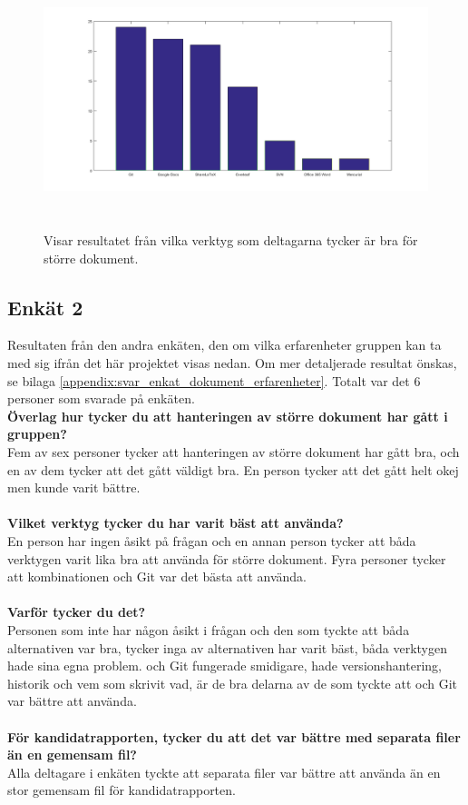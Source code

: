 \begin{figure}[H]
	\centering
	\includegraphics[width=150mm,height=75mm]{figures/best_document_tool.png}
	\caption{Visar resultatet från vilka verktyg som deltagarna tycker är bra för större dokument.}
	\label{fig:best_document_tool}
\end{figure}

\subsection{Enkät 2}
Resultaten från den andra enkäten, den om vilka erfarenheter gruppen kan ta med sig ifrån det här projektet visas nedan. Om mer detaljerade resultat önskas, se bilaga \ref{appendix:svar_enkat_dokument_erfarenheter}. Totalt var det 6 personer som svarade på enkäten.\\
\textbf{Överlag hur tycker du att hanteringen av större dokument har gått i gruppen?}\\
Fem av sex personer tycker att hanteringen av större dokument har gått bra, och en av dem tycker att det gått väldigt bra. En person tycker att det gått helt okej men kunde varit bättre.\\\\
\textbf{Vilket verktyg tycker du har varit bäst att använda?}\\
En person har ingen åsikt på frågan och en annan person tycker att båda verktygen varit lika bra att använda för större dokument. Fyra personer tycker att kombinationen \latex och Git var det bästa att använda.\\\\
\textbf{Varför tycker du det?}\\
Personen som inte har någon åsikt i frågan och den som tyckte att båda alternativen var bra, tycker inga av alternativen har varit bäst, båda verktygen hade sina egna problem. \latex och Git fungerade smidigare, hade versionshantering, historik och vem som skrivit vad, är de bra delarna av de som tyckte att \latex och Git var bättre att använda.\\\\
\textbf{För kandidatrapporten, tycker du att det var bättre med separata filer än en gemensam fil?}\\
Alla deltagare i enkäten tyckte att separata filer var bättre att använda än en stor gemensam fil för kandidatrapporten.


